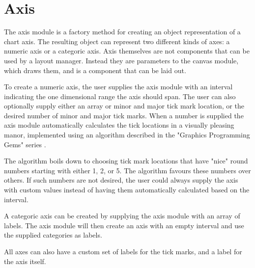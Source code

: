 \section{Axis}
The axis module is a factory method for creating an object representation of a chart axis. The resulting object can represent two different kinds of axes: a numeric axis or a categoric axis. Axis themselves are not components that can be used by a layout manager. Instead they are parameters to the canvas module, which draws them, and is a component that can be laid out. 

To create a numeric axis, the user supplies the axis module with an interval indicating the one dimensional range the axis should span. The user can also optionally supply either an array or minor and major tick mark location, or the desired number of minor and major tick marks.  When a number is supplied the axis module automatically calculates the tick locations in a visually pleasing manor, implemented using an algorithm described in the "Graphics Programming Gems" series \cite{heckbert90}. 

The algorithm boils down to choosing tick mark locations that have "nice" round numbers starting with either 1, 2, or 5. The algorithm favours these numbers over others. If such numbers are not desired, the user could always supply the axis with custom values instead of having them automatically calculated based on the interval.

A categoric axis can be created by supplying the axis module with an array of labels. The axis module will then create an axis with an empty interval and use the supplied categories as labels.

All axes can also have a custom set of labels for the tick marks, and a label for the axis itself.

